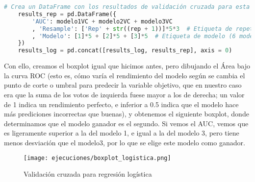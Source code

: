 \documentclass[a4paper,onecolumn]{extarticle}
\begin{document}
\begin{sloppypar}
\begin{lstlisting}[language=Python]
    # Crea un DataFrame con los resultados de validación cruzada para esta repetición
    results_rep = pd.DataFrame({
        'AUC': modelo1VC + modelo2VC + modelo3VC
        , 'Resample': ['Rep' + str((rep + 1))]*5*3  # Etiqueta de repetición (5 repeticiones 6 modelos)
        , 'Modelo': [1]*5 + [2]*5 + [3]*5  # Etiqueta de modelo (6 modelos 5 repeticiones)
    })
    results_log = pd.concat([results_log, results_rep], axis = 0)
\end{lstlisting}

Con ello, creamos el boxplot igual que hicimos antes, pero dibujando el Área bajo la curva ROC (esto es, cómo varía el rendimiento del modelo según se cambia
el punto de corte o umbral para predecir la variable objetivo, que en nuestro caso era que la suma de los votos de izquierda fuese mayor a los de derecha; un 
valor de 1 indica un rendimiento perfecto, e inferior a 0.5 indica que el modelo hace más prediciones incorrectas que buenas), y obtenemos el siguiente boxplot, 
donde determinamos que el modelo ganador es el segundo. Si vemos el AUC, vemos que es ligeramente superior a la del modelo 1, e igual a la del modelo 3, pero 
tiene menos desviación que el modelo3, por lo que se elige este modelo como ganador.
\begin{center}
    \begin{figure}[h]
        \centering
        \texttt{[image: ejecuciones/boxplot\_logistica.png]}
        \caption{Validación cruzada para regresión logística}
        \label{fig:boxplotlog}
    \end{figure}
\end{center}


\end{sloppypar}
\end{document}
